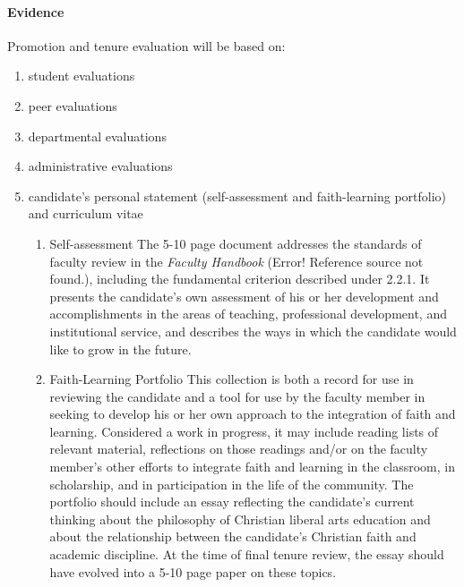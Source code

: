 \documentclass[letterpaper, 11pt]{article}
\begin{document}
			\paragraph{Evidence}
				Promotion and tenure evaluation will be based on:
				\begin{enumerate}[label=\alph*)]
					\item{student evaluations}
					\item{peer evaluations}
					\item{departmental evaluations}
					\item{administrative evaluations}
					\item{candidate's personal statement (self-assessment and faith-learning portfolio) and curriculum vitae
						\begin{enumerate}[label=\arabic*)]
							\item{Self-assessment}
							The 5-10 page document addresses the standards of faculty review in the \emph{Faculty Handbook} (Error! Reference source not found.), including the fundamental criterion described under 2.2.1.  It presents the candidate's own assessment of his or her development and accomplishments in the areas of teaching, professional development, and institutional service, and describes the ways in which the candidate would like to grow in the future.
							\item{Faith-Learning Portfolio}
							This collection is both a record for use in reviewing the candidate and a tool for use by the faculty member in seeking to develop his or her own approach to the integration of faith and learning.  Considered a work in progress, it may include reading lists of relevant material, reflections on those readings and/or on the faculty member's other efforts to integrate faith and learning in the classroom, in scholarship, and in participation in the life of the community.  The portfolio should include an essay reflecting the candidate's current thinking about the philosophy of Christian liberal arts education and about the relationship between the candidate's Christian faith and academic discipline.  At the time of final tenure review, the essay should have evolved into a 5-10 page paper on these topics.
						\end{enumerate}
					}
				\end{enumerate}
\end{document}
